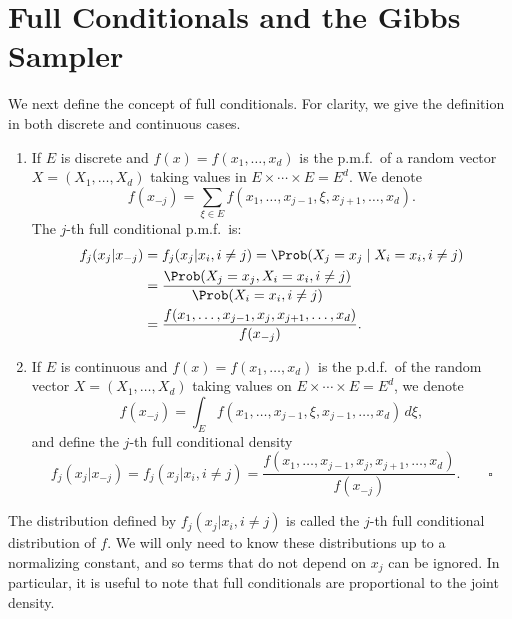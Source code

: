
\section{Full Conditionals and the Gibbs Sampler}
\label{sec:5.2}

We next define the concept of full conditionals. For clarity, we give the definition in both
discrete and continuous cases.

\begin{definition}
\label{def:5.1}
\begin{enumerate}[label=\roman*)]
  \item If $E$ is discrete and $f(x) = f(x_1, \ldots, x_d)$ is the p.m.f.\ of a random vector
    $X = (X_1, \ldots, X_d)$ taking values in $E \times \cdots \times E = E^d$. We denote
    \[
      f(x_{-j}) = \sum_{\xi \in E} f(x_1, \ldots, x_{j-1}, \xi, x_{j+1}, \ldots, x_d).
    \]
    The $j$-th full conditional p.m.f.\ is:
    \begin{align*}
      f_j(x_j | x_{-j})
        &= f_j(x_j | x_i, i \neq j)
         = \Prob(X_j = x_j \mid X_i = x_i, i \neq j)\\
        &= \frac{\Prob(X_j = x_j, X_i = x_i, i \neq j)}{\Prob(X_i = x_i, i \neq j)}\\
        &= \frac{f(x_1, \ldots, x_{j-1}, x_j, x_{j+1}, \ldots, x_d)}{f(x_{-j})}.
    \end{align*}

  \item If $E$ is continuous and $f(x) = f(x_1, \ldots, x_d)$ is the p.d.f.\ of the random
    vector $X = (X_1, \ldots, X_d)$ taking values on $E \times \cdots \times E = E^d$, we denote
    \[
      f(x_{-j}) = \int_E f(x_1, \ldots, x_{j-1}, \xi, x_{j-1}, \ldots, x_d)\, d\xi,
    \]
    and define the $j$-th full conditional density
    \[
      f_j(x_j | x_{-j}) = f_j(x_j | x_i, i \neq j)
      = \frac{f(x_1, \ldots, x_{j-1}, x_j, x_{j+1}, \ldots, x_d)}{f(x_{-j})}.\qquad\square
    \]
\end{enumerate}
\end{definition}

The distribution defined by $f_j(x_j | x_i, i \neq j)$ is called the $j$-th full conditional
distribution of $f$. We will only need to know these distributions up to a normalizing constant,
and so terms that do not depend on $x_j$ can be ignored. In particular, it is useful to note that
full conditionals are proportional to the joint density.

